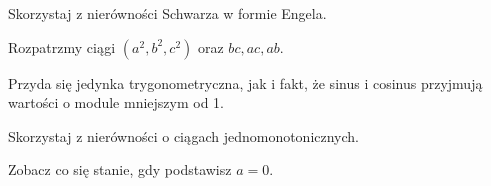 
\begin{hints_list}
	\item Skorzystaj z nierówności Schwarza w formie Engela.
	\item Rozpatrzmy ciągi $(a^2, b^2, c^2)$ oraz $bc, ac, ab$.
	\item Przyda się jedynka trygonometryczna, jak i fakt, że sinus i cosinus przyjmują wartości o module mniejszym od 1.
	\item Skorzystaj z nierówności o ciągach jednomonotonicznych.
	\item Zobacz co się stanie, gdy podstawisz $a = 0$.
\end{hints_list}